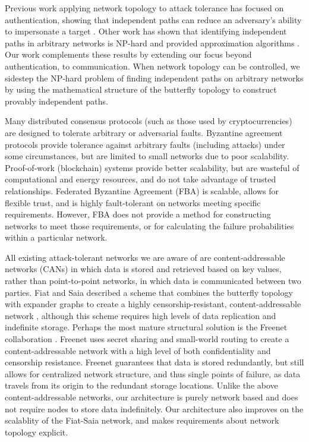 \documentclass[10pt,letterpaper]{article}
\begin{document}
Previous work applying network topology to attack tolerance has
focused on authentication,
showing that independent paths can reduce an adversary's ability
to impersonate a target
\cite{levien_attack-resistant_2009}.
Other work has shown that identifying independent paths in arbitrary networks
is NP-hard and provided approximation algorithms
\cite{reiter_resilient_1998}.
Our work complements these results by extending our focus beyond authentication,
to communication.
When network topology can be controlled, we sidestep the NP-hard problem of finding
independent paths on arbitrary networks by using the mathematical structure of
the butterfly topology to construct provably independent paths.

Many distributed consensus protocols (such as those used by cryptocurrencies)
are designed to tolerate arbitrary or adversarial faults.
Byzantine agreement protocols
\cite{lamport_byzantine_1982,castro_practical_1999}
provide tolerance against arbitrary faults (including attacks) under
some circumstances, but are limited to small networks due to poor scalability.
Proof-of-work \cite{dwork_pricing_1993,nakamoto_bitcoin:_2008} (blockchain)
systems provide better scalability,
but are wasteful of computational and energy resources,
and do not take advantage of trusted relationships.
Federated Byzantine Agreement (FBA) \cite{mazieres_stellar_2015}
is scalable, allows for flexible trust,
and is highly fault-tolerant on networks meeting specific requirements.
However, FBA does not provide a method for constructing networks to meet
those requirements,
or for calculating the failure probabilities within a particular network.

All existing attack-tolerant networks we are aware of are content-addressable
networks (CANs) in which data is stored and retrieved based on key values,
rather than point-to-point networks, in which data is communicated between
two parties.
Fiat and Saia described a scheme that combines the butterfly topology
with expander graphs to create a highly censorship-resistant,
content-addressable network \cite{fiat_censorship_2002},
although this scheme requires high levels of data replication and indefinite
storage.
Perhaps the most mature structural solution is the Freenet collaboration
\cite{clarke_freenet:_2001}.
Freenet uses secret sharing
\cite{shamir_how_1979, blakley_safeguarding_1979}
and small-world routing
\cite{zhang_using_2002,kleinberg_small-world_2000}
to create a content-addressable network with a high level of both
confidentiality and censorship resistance.
Freenet guarantees that data is stored redundantly,
but still allows for centralized network structure,
and thus single points of failure,
as data travels from its origin to the redundant storage locations.
Unlike the above content-addressable networks, our architecture is purely network based
and does not require nodes to store data indefinitely.
Our architecture also improves on the scalablity of the Fiat-Saia network,
and makes requirements about network topology explicit.
\end{document}

